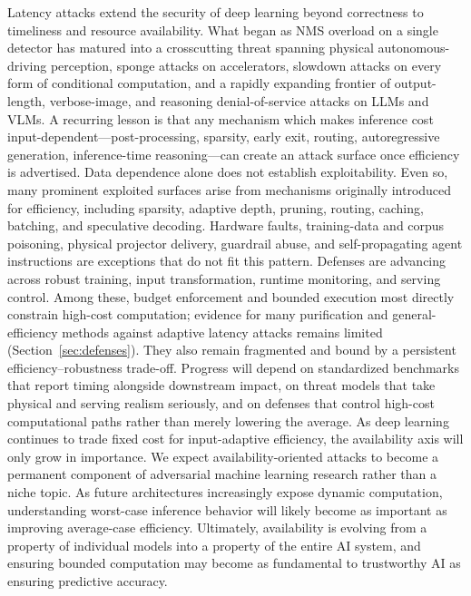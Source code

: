 \documentclass[acmsmall,screen,review,nonacm]{acmart}
\begin{document}
Latency attacks extend the security of deep learning beyond correctness to timeliness and resource availability. What began as NMS overload on a single detector has matured into a crosscutting threat spanning physical autonomous-driving perception, sponge attacks on accelerators, slowdown attacks on every form of conditional computation, and a rapidly expanding frontier of output-length, verbose-image, and reasoning denial-of-service attacks on LLMs and VLMs. A recurring lesson is that any mechanism which makes inference cost input-dependent---post-processing, sparsity, early exit, routing, autoregressive generation, inference-time reasoning---can create an attack surface once efficiency is advertised. Data dependence alone does not establish exploitability. Even so, many prominent exploited surfaces arise from mechanisms originally introduced for efficiency, including sparsity, adaptive depth, pruning, routing, caching, batching, and speculative decoding. Hardware faults, training-data and corpus poisoning, physical projector delivery, guardrail abuse, and self-propagating agent instructions are exceptions that do not fit this pattern. Defenses are advancing across robust training, input transformation, runtime monitoring, and serving control. Among these, budget enforcement and bounded execution most directly constrain high-cost computation; evidence for many purification and general-efficiency methods against adaptive latency attacks remains limited (Section~\ref{sec:defenses}). They also remain fragmented and bound by a persistent efficiency--robustness trade-off. Progress will depend on standardized benchmarks that report timing alongside downstream impact, on threat models that take physical and serving realism seriously, and on defenses that control high-cost computational paths rather than merely lowering the average. As deep learning continues to trade fixed cost for input-adaptive efficiency, the availability axis will only grow in importance. We expect availability-oriented attacks to become a permanent component of adversarial machine learning research rather than a niche topic. As future architectures increasingly expose dynamic computation, understanding worst-case inference behavior will likely become as important as improving average-case efficiency. Ultimately, availability is evolving from a property of individual models into a property of the entire AI system, and ensuring bounded computation may become as fundamental to trustworthy AI as ensuring predictive accuracy.

\end{document}

